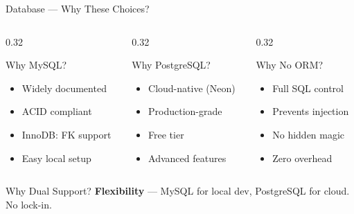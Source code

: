 \documentclass[aspectratio=169, 12pt]{beamer}
\begin{document}
\begin{frame}{Database --- Why These Choices?}

\begin{columns}[T]
\begin{column}{0.32\textwidth}
\begin{block}{Why MySQL?}
\small
\begin{itemize}\itemsep=0pt
    \item Widely documented
    \item ACID compliant
    \item InnoDB: FK support
    \item Easy local setup
\end{itemize}
\end{block}
\end{column}
\begin{column}{0.32\textwidth}
\begin{block}{Why PostgreSQL?}
\small
\begin{itemize}\itemsep=0pt
    \item Cloud-native (Neon)
    \item Production-grade
    \item Free tier
    \item Advanced features
\end{itemize}
\end{block}
\end{column}
\begin{column}{0.32\textwidth}
\begin{block}{Why No ORM?}
\small
\begin{itemize}\itemsep=0pt
    \item Full SQL control
    \item Prevents injection
    \item No hidden magic
    \item Zero overhead
\end{itemize}
\end{block}
\end{column}
\end{columns}

\vspace{4pt}
\begin{exampleblock}{Why Dual Support?}
\textbf{Flexibility} --- MySQL for local dev, PostgreSQL for cloud. No lock-in.
\end{exampleblock}
\end{frame}
\end{document}

